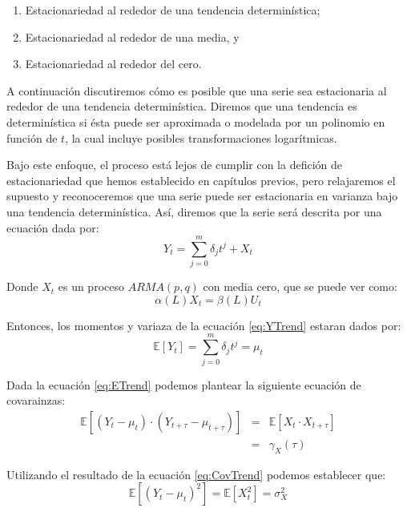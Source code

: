 \documentclass[
]{book}
\begin{document}
\begin{enumerate}
\def\labelenumi{\arabic{enumi}.}
\item
  Estacionariedad al rededor de una tendencia determinística;
\item
  Estacionariedad al rededor de una media, y
\item
  Estacionariedad al rededor del cero.
\end{enumerate}

A continuación discutiremos cómo es posible que una serie sea estacionaria al rededor de una tendencia determinística. Diremos que una tendencia es determinística si ésta puede ser aproximada o modelada por un polinomio en función de \(t\), la cual incluye posibles transformaciones logarítmicas.

Bajo este enfoque, el proceso está lejos de cumplir con la defición de estacionariedad que hemos establecido en capítulos previos, pero relajaremos el supuesto y reconoceremos que una serie puede ser estacionaria en varianza bajo una tendencia determinística. Así, diremos que la serie será descrita por una ecuación dada por:
\begin{equation}
    Y_t = \sum^m_{j = 0} \delta_j t^j + X_t
    \label{eq:YTrend}
\end{equation}

Donde \(X_t\) es un proceso \(ARMA(p, q)\) con media cero, que se puede ver como:
\begin{equation}
    \alpha(L) X_t = \beta(L) U_t
\end{equation}

Entonces, los momentos y variaza de la ecuación \eqref{eq:YTrend} estaran dados por:
\begin{equation}
    \mathbb{E}[Y_t] = \sum^m_{j = 0} \delta_j t^j = \mu_t
    \label{eq:ETrend}
\end{equation}

Dada la ecuación \eqref{eq:ETrend} podemos plantear la siguiente ecuación de covarainzas:
\begin{eqnarray}
    \mathbb{E}[(Y_t - \mu_t) \cdot (Y_{t+\tau} - \mu_{t+\tau})] & = & \mathbb{E}[X_t \cdot X_{t+\tau}] \nonumber \\
    & = & \gamma_X(\tau)
    \label{eq:CovTrend}
\end{eqnarray}

Utilizando el resultado de la ecuación \eqref{eq:CovTrend} podemos establecer que:
\begin{equation}
    \mathbb{E}[(Y_t - \mu_t)^2] = \mathbb{E}[X_t^2] = \sigma_X^2
    \label{eq:VarTrend}
\end{equation}
\end{document}
